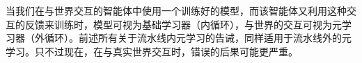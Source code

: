 当我们在与世界交互的智能体中使用一个训练好的模型，而该智能体又利用这种交互的反馈来训练时，模型可视为基础学习器（内循环），与世界的交互可视为元学习器（外循环）。前述所有关于流水线内元学习的告诫，同样适用于流水线外的元学习。只不过现在，在与真实世界交互时，错误的后果可能更严重。







